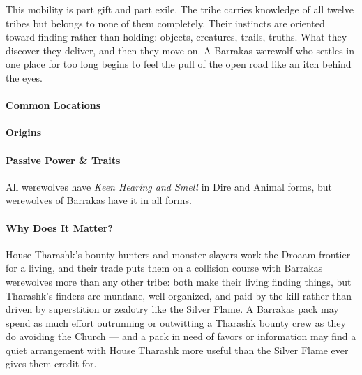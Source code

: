 \documentclass[twocolumn]{dndbook}
\begin{document}
This mobility is part gift and part exile.
The tribe carries knowledge of all twelve tribes but belongs to none of them completely.
Their instincts are oriented toward finding rather than holding: objects, creatures, trails, truths.
What they discover they deliver, and then they move on.
A Barrakas werewolf who settles in one place for too long begins to feel the pull of the open road like an itch behind the eyes.\par

\paragraph*{Common Locations}

\paragraph*{Origins}

\paragraph*{Passive Power \& Traits} All werewolves have \emph{Keen Hearing and Smell} in Dire and Animal forms, but werewolves of Barrakas have it in all forms.\par

\paragraph*{Why Does It Matter?} House Tharashk's bounty hunters and monster-slayers work the Droaam frontier for a living, and their trade puts them on a collision course with Barrakas werewolves more than any other tribe: both make their living finding things, but Tharashk's finders are mundane, well-organized, and paid by the kill rather than driven by superstition or zealotry like the Silver Flame.
A Barrakas pack may spend as much effort outrunning or outwitting a Tharashk bounty crew as they do avoiding the Church --- and a pack in need of favors or information may find a quiet arrangement with House Tharashk more useful than the Silver Flame ever gives them credit for.
\end{document}
